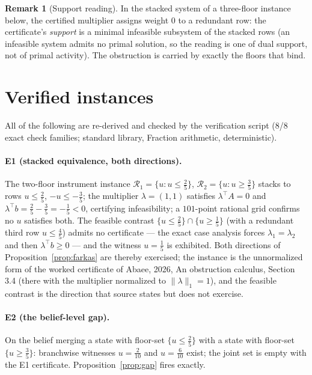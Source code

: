 \documentclass[10pt,twocolumn]{article}
\theoremstyle{definition}
\newtheorem{remark}{Remark}
\begin{document}
\begin{remark}[Support reading]
In the stacked system of a three-floor instance below, the certified
multiplier assigns weight $0$ to a redundant row: the certificate's
\emph{support} is a minimal infeasible subsystem of the stacked rows (an
infeasible system admits no primal solution, so the reading is one of dual
support, not of primal activity). The obstruction is carried by exactly
the floors that bind.
\end{remark}

\section{Verified instances}

All of the following are re-derived and checked by the verification script
(\textsf{8/8 exact check families}; standard library, Fraction arithmetic,
deterministic).

\paragraph{E1 (stacked equivalence, both directions).}
The two-floor instrument instance $\mathcal R_1=\{u: u\le\tfrac25\}$,
$\mathcal R_2=\{u: u\ge\tfrac35\}$ stacks to rows $u\le\tfrac25$,
$-u\le-\tfrac35$; the multiplier $\lambda=(1,1)$ satisfies
$\lambda^{\top}A=0$ and $\lambda^{\top}b=\tfrac25-\tfrac35=-\tfrac15<0$,
certifying infeasibility; a $101$-point rational grid confirms no $u$
satisfies both. The feasible contrast $\{u\le\tfrac25\}\cap\{u\ge\tfrac15\}$
(with a redundant third row $u\le\tfrac45$) admits no certificate --- the
exact case analysis forces $\lambda_1=\lambda_2$ and then
$\lambda^{\top}b\ge 0$ --- and the witness $u=\tfrac15$ is exhibited. Both
directions of Proposition~\ref{prop:farkas} are thereby exercised; the
instance is the unnormalized form of the worked certificate of Abaee, 2026, An obstruction calculus,
Section 3.4 (there with the multiplier normalized to $\|\lambda\|_1=1$),
and the feasible contrast is the direction that source states but does not
exercise.

\paragraph{E2 (the belief-level gap).}
On the belief merging a state with floor-set $\{u\le\tfrac25\}$ with a
state with floor-set $\{u\ge\tfrac35\}$: branchwise witnesses $u=\tfrac2{10}$
and $u=\tfrac6{10}$ exist; the joint set is empty with the E1 certificate.
Proposition~\ref{prop:gap} fires exactly.
\end{document}
